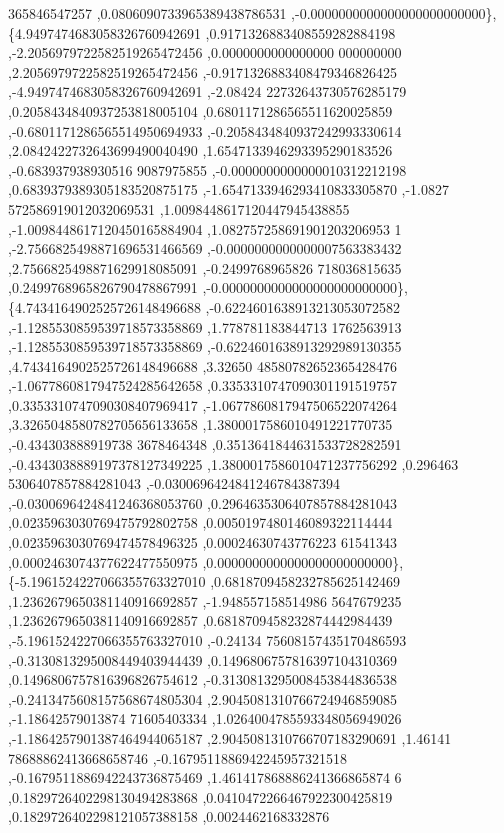 \begin{DoxyCode}
      365846547257 ,0.0806090733965389438786531 ,-0.0000000000000000000000000\},
\{4.9497474683058326760942691 ,0.9171326883408559282884198 ,-2.2056979722582519265472456 ,0.0000000000000000
      000000000 ,2.2056979722582519265472456 ,-0.9171326883408479346826425 ,-4.9497474683058326760942691 ,-2.08424
      22732643730576285179 ,0.2058434840937253818005104 ,0.6801171286565511620025859 ,-0.6801171286565514950694933
       ,-0.2058434840937242993330614 ,2.0842422732643699490040490 ,1.6547133946293395290183526 ,-0.683937938930516
      9087975855 ,-0.0000000000000010312212198 ,0.6839379389305183520875175 ,-1.6547133946293410833305870 ,-1.0827
      572586919012032069531 ,1.0098448617120447945438855 ,-1.0098448617120450165884904 ,1.082757258691901203206953
      1 ,-2.7566825498871696531466569 ,-0.0000000000000007563383432 ,2.7566825498871629918085091 ,-0.2499768965826
      718036815635 ,0.2499768965826790478867991 ,-0.0000000000000000000000000\},
\{4.7434164902525726148496688 ,-0.6224601638913213053072582 ,-1.1285530859539718573358869 ,1.778781183844713
      1762563913 ,-1.1285530859539718573358869 ,-0.6224601638913292989130355 ,4.7434164902525726148496688 ,3.32650
      48580782652365428476 ,-1.0677860817947524285642658 ,0.3353310747090301191519757 ,0.3353310747090308407969417
       ,-1.0677860817947506522074264 ,3.3265048580782705656133658 ,1.3800017586010491221770735 ,-0.434303888919738
      3678464348 ,0.3513641844631533728282591 ,-0.4343038889197378127349225 ,1.3800017586010471237756292 ,0.296463
      5306407857884281043 ,-0.0300696424841246784387394 ,-0.0300696424841246368053760 ,0.2964635306407857884281043
       ,0.0235963030769475792802758 ,0.0050197480146089322114444 ,0.0235963030769474578496325 ,0.00024630743776223
      61541343 ,0.0002463074377622477550975 ,0.0000000000000000000000000\},
\{-5.1961524227066355763327010 ,0.6818709458232785625142469 ,1.2362679650381140916692857 ,-1.948557158514986
      5647679235 ,1.2362679650381140916692857 ,0.6818709458232874442984439 ,-5.1961524227066355763327010 ,-0.24134
      75608157435170486593 ,-0.3130813295008449403944439 ,0.1496806757816397104310369 ,0.1496806757816396826754612
       ,-0.3130813295008453844836538 ,-0.2413475608157568674805304 ,2.9045081310766724946859085 ,-1.18642579013874
      71605403334 ,1.0264004785593348056949026 ,-1.1864257901387464944065187 ,2.9045081310766707183290691 ,1.46141
      78688862413668658746 ,-0.1679511886942245957321518 ,-0.1679511886942243736875469 ,1.461417868886241366865874
      6 ,0.1829726402298130494283868 ,0.0410472266467922300425819 ,0.1829726402298121057388158 ,0.0024462168332876

\end{DoxyCode}
